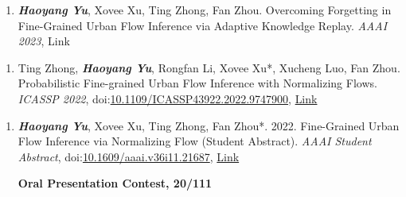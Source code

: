 
\begin{enumerate}[resume]
    \item  \textit{\textbf{Haoyang Yu}}, Xovee Xu, Ting Zhong, Fan Zhou. Overcoming Forgetting in Fine-Grained Urban Flow Inference via Adaptive Knowledge Replay. \textit{AAAI 2023}, 
     {\color{Green}Link}

\end{enumerate}


\begin{enumerate}[resume]
    \item Ting Zhong, \textit{\textbf{Haoyang Yu}}, Rongfan Li, Xovee Xu*, Xucheng Luo, Fan Zhou. Probabilistic Fine-grained Urban Flow Inference with Normalizing Flows. \textit{ICASSP 2022}, doi:\href{papers/ICASSP_2022_FUFI.pdf}{10.1109/ICASSP43922.2022.9747900}, \href{https://ieeexplore.ieee.org/document/9747900}
    {\color{Green}Link}

\end{enumerate}


\begin{enumerate}[resume]
    \item \textit{\textbf{Haoyang Yu}}, Xovee Xu, Ting Zhong, Fan Zhou*. 2022. Fine-Grained Urban Flow Inference via Normalizing Flow (Student Abstract). \textit{AAAI Student Abstract}, doi:\href{https://doi.org/10.1609/aaai.v36i11.21687}{10.1609/aaai.v36i11.21687}, \href{https://ojs.aaai.org/index.php/AAAI/article/view/21687}
    {\color{Green}Link}

    \textbf{\color{red}Oral Presentation Contest, 20/111}
\end{enumerate}